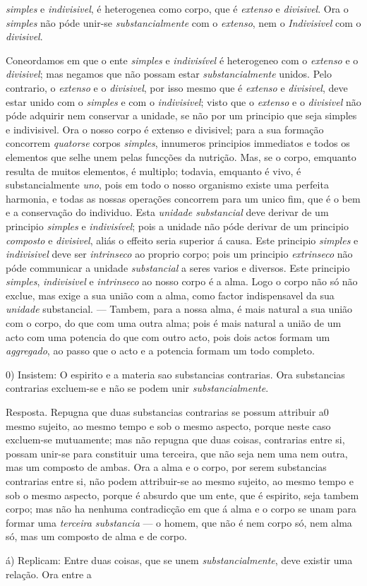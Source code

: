 \emph{simples} e \emph{indivisivel}, é heterogenea como corpo, que é \emph{extenso} e \emph{divisivel}. Ora o \emph{simples} não póde unir-se \emph{substancialmente} com o \emph{extenso}, nem o \emph{Indivisivel} com o \emph{divisivel}.\par Coneordamos em que o ente \emph{simples} e \emph{indivisível} é heterogeneo com o \emph{extenso} e o \emph{divisivel}; mas negamos que não possam estar \emph{substancialmente} unidos. Pelo contrario, o \emph{extenso} e o \emph{divisivel}, por isso mesmo que é \emph{extenso} e \emph{divisivel}, deve estar unido com o \emph{simples} e com o \emph{indivisivel}; visto que o \emph{extenso} e o \emph{divisivel} não póde adquirir nem conservar a unidade, se não por um principio que seja simples e indivisivel. Ora o nosso corpo é extenso e divisivel; para a sua formação concorrem \emph{quatorse} corpos \emph{simples}, innumeros principios immediatos e todos os elementos que selhe unem pelas funcções da nutrição. Mas, se o corpo, emquanto resulta de muitos elementos, é multiplo; todavia, emquanto é vivo, é substancialmente \emph{uno}, pois em todo o nosso organismo existe uma perfeita harmonia, e todas as nossas operações concorrem para um unico fim, que é o bem e a conservação do individuo. Esta \emph{unidade substancial} deve derivar de um principio \emph{simples} e \emph{indivisível}; pois a unidade não póde derivar de um principio \emph{composto} e \emph{divisivel}, aliás o effeito seria superior á causa. Este principio \emph{simples} e \emph{indivisivel} deve ser \emph{intrinseco} ao proprio corpo; pois um principio \emph{extrinseco} não póde communicar a unidade \emph{substancial} a seres varios e diversos. Este principio \emph{simples}, \emph{indivisivel} e \emph{intrinseco} ao nosso corpo é a alma. Logo o corpo não só não exclue, mas exige a sua união com a alma, como factor indispensavel da sua \emph{unidade} substancial. --- Tambem, para a nossa alma, é mais natural a sua união com o corpo, do que com uma outra alma; pois é mais natural a união de um acto com uma potencia do que com outro acto, pois dois actos formam um \emph{aggregado}, ao passo que o acto e a potencia formam um todo completo.\par 0) Insistem: O espirito e a materia sao substancias contrarias. Ora substancias contrarias excluem-se e não se podem unir \emph{substancialmente}.\par Resposta. Repugna que duas substancias contrarias se possum attribuir a0 mesmo sujeito, ao mesmo tempo e sob o mesmo aspecto, porque neste caso excluem-se mutuamente; mas não repugna que duas coisas, contrarias entre si, possam unir-se para constituir uma terceira, que não seja nem uma nem outra, mas um composto de ambas. Ora a alma e o corpo, por serem substancias contrarias entre si, não podem attribuir-se ao mesmo sujeito, ao mesmo tempo e sob o mesmo aspecto, porque é absurdo que um ente, que é espirito, seja tambem corpo; mas não ha nenhuma contradicção em que á alma e o corpo se unam para formar uma \emph{terceira substancia} --- o homem, que não é nem corpo só, nem alma só, mas um composto de alma e de corpo.\par á) Replicam: Entre duas coisas, que se unem \emph{substancialmente}, deve existir uma relação. Ora entre a 
